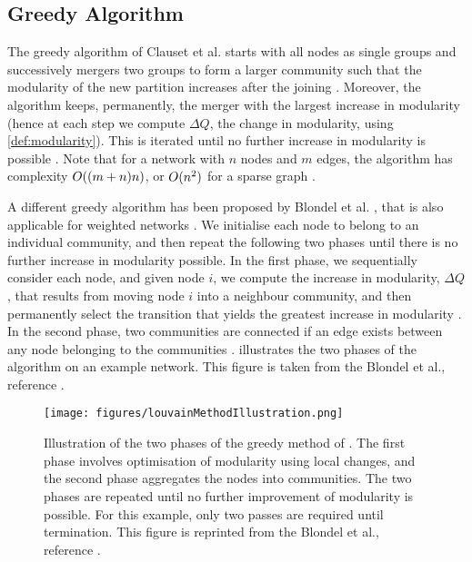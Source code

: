 
\subsection{Greedy Algorithm}
\label{subsec:greedyAlgorithm}

The greedy algorithm of Clauset et al. \cite{CNM04} starts with all nodes as single groups and successively mergers two groups to form a larger community such that the modularity of the new partition increases after the joining \cite{CNM04,For10}.
Moreover, the algorithm keeps, permanently, the merger with the largest increase in modularity (hence at each step we compute $\Delta Q$, the change in modularity, using \cref{def:modularity}).
This is iterated until no further increase in modularity is possible \cite{CNM04}.
Note that for a network with $n$ nodes and $m$ edges, the algorithm has complexity $O((m+n)n)$, or $O(n^{2})$ for a sparse graph \cite{For10}.

A different greedy algorithm has been proposed by Blondel et al. \cite{BGL+08}, that is also applicable for weighted networks \cite{For10}.
We initialise each node to belong to an individual community, and then repeat the following two phases until there is no further increase in modularity possible.
In the first phase, we sequentially consider each node, and given node $i$, we compute the increase in modularity, $\Delta Q$, that results from moving node $i$ into a neighbour community, and then permanently select the transition that yields the greatest increase in modularity \cite{BGL+08,For10}.
In the second phase, two communities are connected if an edge exists between any node belonging to the communities \cite{BGL+08,For10}.
 illustrates the two phases of the algorithm on an example network. This figure is taken from the Blondel et al., reference \cite{BGL+08}.

\begin{figure}
	\centering
	\texttt{[image: figures/louvainMethodIllustration.png]}
	\caption[Illustration of greedy algorithm for modularity optimisation.]{\label{fig:LouvainMethodIllustration} Illustration of the two phases of the greedy method of \cite{BGL+08}. The first phase involves optimisation of modularity using local changes, and the second phase aggregates the nodes into communities. The two phases are repeated until no further improvement of modularity is possible. For this example, only two passes are required until termination. This figure is reprinted from the Blondel et al., reference \cite{BGL+08}.}
\end{figure}

